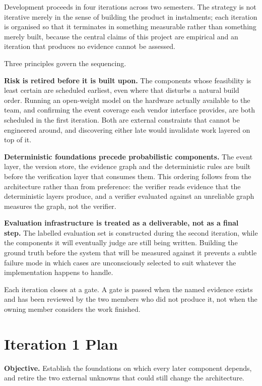 Development proceeds in four iterations across two semesters. The strategy is
not iterative merely in the sense of building the product in instalments; each
iteration is organised so that it terminates in something measurable rather than
something merely built, because the central claims of this project are empirical
and an iteration that produces no evidence cannot be assessed.

Three principles govern the sequencing.

\textbf{Risk is retired before it is built upon.} The components whose
feasibility is least certain are scheduled earliest, even where that disturbs a
natural build order. Running an open-weight model on the hardware actually
available to the team, and confirming the event coverage each vendor interface
provides, are both scheduled in the first iteration. Both are external
constraints that cannot be engineered around, and discovering either late would
invalidate work layered on top of it.

\textbf{Deterministic foundations precede probabilistic components.} The event
layer, the version store, the evidence graph and the deterministic rules are
built before the verification layer that consumes them. This ordering follows
from the architecture rather than from preference: the verifier reads evidence
that the deterministic layers produce, and a verifier evaluated against an
unreliable graph measures the graph, not the verifier.

\textbf{Evaluation infrastructure is treated as a deliverable, not as a final
step.} The labelled evaluation set is constructed during the second iteration,
while the components it will eventually judge are still being written. Building
the ground truth before the system that will be measured against it prevents a
subtle failure mode in which cases are unconsciously selected to suit whatever
the implementation happens to handle.

Each iteration closes at a gate. A gate is passed when the named evidence exists
and has been reviewed by the two members who did not produce it, not when the
owning member considers the work finished.

\section{Iteration 1 Plan}

\textbf{Objective.} Establish the foundations on which every later component
depends, and retire the two external unknowns that could still change the
architecture.

